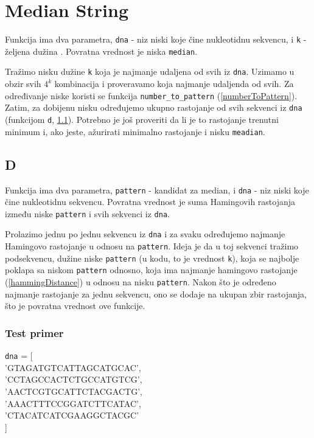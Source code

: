 \section{Median String}

Funkcija ima dva parametra, \texttt{dna} - niz niski koje čine nukleotidnu sekvencu, i \texttt{k} - željena dužina . Povratna vrednost je niska \texttt{median}.

Tražimo nisku dužine \texttt{k} koja je najmanje udaljena od svih iz \texttt{dna}. Uzimamo u obzir svih $4^k$ kombinacija i proveravamo koja najmanje udaljenda od svih. Za određivanje niske koristi se funkcija \texttt{number\_to\_pattern} (\ref{numberToPattern}). Zatim, za dobijenu nisku određujemo ukupno rastojanje od svih sekvenci iz \texttt{dna} (funkcijom \texttt{d}, \ref{d}). Potrebno je još proveriti da li je to rastojanje trenutni minimum i, ako jeste, ažurirati minimalno rastojanje i nisku \texttt{meadian}.



\subsection{D}
\label{d}
Funkcija ima dva parametra, \texttt{pattern} - kandidat za median, i \texttt{dna} - niz niski koje čine nukleotidnu sekvencu. Povratna vrednost je suma Hamingovih rastojanja između niske \texttt{pattern} i svih sekvenci iz \texttt{dna}.

Prolazimo jednu po jednu sekvencu iz \texttt{dna} i za svaku određujemo najmanje Hamingovo rastojanje u odnosu na \texttt{pattern}. Ideja je da u toj sekvenci tražimo podsekvencu, dužine niske \texttt{pattern} (u kodu, to je vrednost \texttt{k}), koja se najbolje poklapa sa niskom \texttt{pattern} odnosno, koja ima najmanje hamingovo rastojanje (\ref{hammingDistance}) u odnosu na nisku \texttt{pattern}. Nakon što je određeno najmanje rastojanje za jednu sekvencu, ono se dodaje na ukupan zbir rastojanja, što je povratna vrednost ove funkcije.





\subsubsection{Test primer}
\noindent\texttt{dna} = [ \\
\indent'GTAGATGTCATTAGCATGCAC', \\
\indent'CCTAGCCACTCTGCCATGTCG', \\
\indent'AACTCGTGCATTCTACGACTG', \\
\indent'AAACTTTCCGGATCTTCATAC', \\
\indent'CTACATCATCGAAGGCTACGC' \\
]

